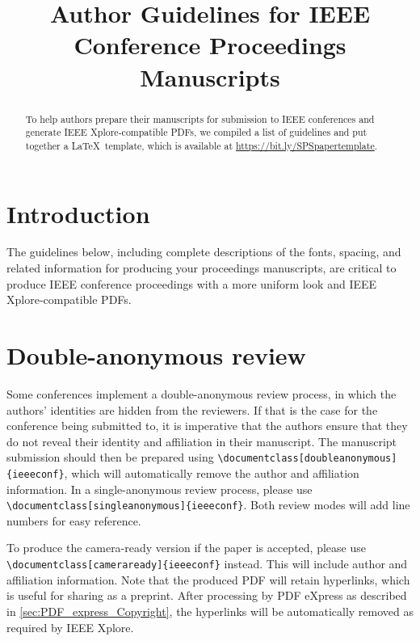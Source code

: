 \documentclass[9pt]{ieeeconf}
\title{Author Guidelines for IEEE Conference Proceedings Manuscripts}
\begin{document}
\maketitle

\begin{abstract}
To help authors prepare their manuscripts for submission to IEEE conferences and generate IEEE Xplore-compatible PDFs, we compiled a list of guidelines and put together a \LaTeX\ template, which is available at \url{https://bit.ly/SPSpapertemplate}. 
\end{abstract}


\section{Introduction}
\label{sec:intro}

The guidelines below, including complete descriptions of the fonts, spacing, and related information for producing your proceedings manuscripts, are critical to produce IEEE conference proceedings with a more uniform look and IEEE Xplore-compatible PDFs.


\section{Double-anonymous review}
\label{sec:double_anonymous}

Some conferences implement a double-anonymous review process, in which the authors' identities are hidden from the reviewers. If that is the case for the conference being submitted to, it is imperative that the authors ensure that they do not reveal their identity and affiliation in their manuscript. The manuscript submission should then be prepared using \texttt{\textbackslash{}documentclass[doubleanonymous]\{ieeeconf\}}, which will automatically remove the author and affiliation information. In a single-anonymous review process, please use \texttt{\textbackslash{}documentclass[singleanonymous]\{ieeeconf\}}. Both review modes will add line numbers for easy reference.

To produce the camera-ready version if the paper is accepted, please use \texttt{\textbackslash{}documentclass[cameraready]\{ieeeconf\}} instead. This will include author and affiliation information. Note that the produced PDF will retain hyperlinks, which is useful for sharing as a preprint. After processing by PDF eXpress as described in \cref{sec:PDF_express_Copyright}, the hyperlinks will be automatically removed as required by IEEE Xplore.
\end{document}
